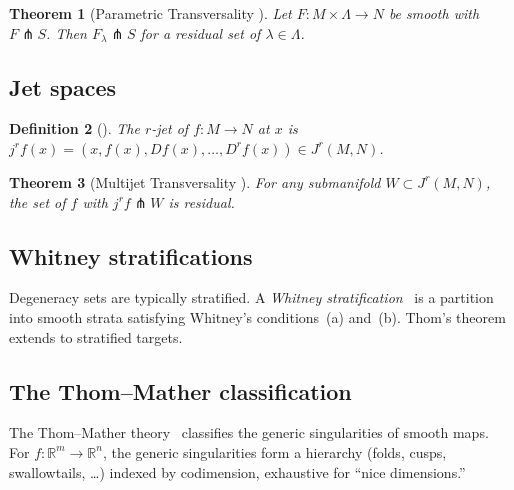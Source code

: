 \documentclass[11pt,a4paper]{article}
\newtheorem{theorem}{Theorem}[section]
\newtheorem{definition}[theorem]{Definition}
\newcommand{\R}{\mathbb{R}}
\begin{document}
\begin{theorem}[Parametric Transversality
  {\cite{GuilleminPollack1974,Hirsch1976}}]
\label{thm:parametric}
Let $F:M\times\Lambda\to N$ be smooth with $F\pitchfork S$.  Then
$F_\lambda\pitchfork S$ for a residual set of $\lambda\in\Lambda$.
\end{theorem}

\subsection{Jet spaces}

\begin{definition}[{\cite{Ehresmann1951}}]
The $r$-jet of $f:M\to N$ at $x$ is
$j^r f(x) = (x, f(x), Df(x), \ldots, D^rf(x))
\in J^r(M,N)$.
\end{definition}

\begin{theorem}[Multijet Transversality
  {\cite{Mather1970,GolubitskyGuillemin1973}}]
\label{thm:multijet}
For any submanifold $W\subset J^r(M,N)$, the set of $f$ with
$j^rf\pitchfork W$ is residual.
\end{theorem}

\subsection{Whitney stratifications}

Degeneracy sets are typically stratified.  A \emph{Whitney
stratification}~\cite{Whitney1965} is a partition into smooth strata
satisfying Whitney's conditions~(a) and~(b).  Thom's theorem
extends to stratified targets.

\subsection{The Thom--Mather classification}

The Thom--Mather theory~\cite{Mather1970,Mather1971,
GolubitskyGuillemin1973} classifies the generic singularities of
smooth maps.  For $f:\R^m\to\R^n$, the generic singularities form a
hierarchy (folds, cusps, swallowtails, \ldots) indexed by codimension,
exhaustive for ``nice dimensions.''
\end{document}
